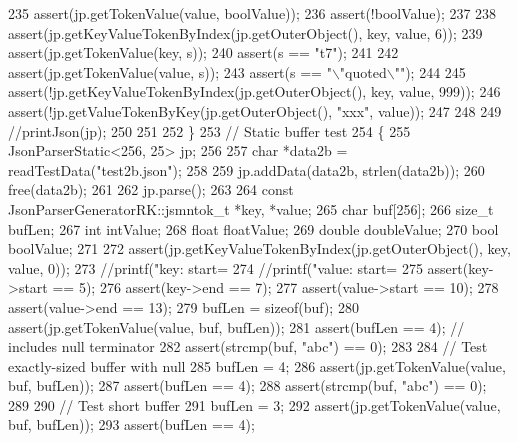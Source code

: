 \begin{DoxyCode}
{{{235         assert(jp.getTokenValue(value, boolValue));
236         assert(!boolValue);
237 
238         assert(jp.getKeyValueTokenByIndex(jp.getOuterObject(), key, value, 6));
239         assert(jp.getTokenValue(key, s));
240         assert(s == \textcolor{stringliteral}{"t7"});
241 
242         assert(jp.getTokenValue(value, s));
243         assert(s == \textcolor{stringliteral}{"\(\backslash\)"quoted\(\backslash\)""});
244 
245         assert(!jp.getKeyValueTokenByIndex(jp.getOuterObject(), key, value, 999));
246         assert(!jp.getValueTokenByKey(jp.getOuterObject(), \textcolor{stringliteral}{"xxx"}, value));
247 
248 
249         \textcolor{comment}{//printJson(jp);}
250 
251 
252     \}
253     \textcolor{comment}{// Static buffer test}
254     \{
255         JsonParserStatic<256, 25> jp;
256 
257         \textcolor{keywordtype}{char} *data2b = readTestData(\textcolor{stringliteral}{"test2b.json"});
258 
259         jp.addData(data2b, strlen(data2b));
260         free(data2b);
261 
262         jp.parse();
263 
264         \textcolor{keyword}{const} JsonParserGeneratorRK::jsmntok_t *key, *value;
265         \textcolor{keywordtype}{char} buf[256];
266         \textcolor{keywordtype}{size\_t} bufLen;
267         \textcolor{keywordtype}{int} intValue;
268         \textcolor{keywordtype}{float} floatValue;
269         \textcolor{keywordtype}{double} doubleValue;
270         \textcolor{keywordtype}{bool} boolValue;
271 
272         assert(jp.getKeyValueTokenByIndex(jp.getOuterObject(), key, value, 0));
273         \textcolor{comment}{//printf("key: start=%
274         \textcolor{comment}{//printf("value: start=%
275         assert(key->start == 5);
276         assert(key->end == 7);
277         assert(value->start == 10);
278         assert(value->end == 13);
279         bufLen = \textcolor{keyword}{sizeof}(buf);
280         assert(jp.getTokenValue(value, buf, bufLen));
281         assert(bufLen == 4); \textcolor{comment}{// includes null terminator}
282         assert(strcmp(buf, \textcolor{stringliteral}{"abc"}) == 0);
283 
284         \textcolor{comment}{// Test exactly-sized buffer with null}
285         bufLen = 4;
286         assert(jp.getTokenValue(value, buf, bufLen));
287         assert(bufLen == 4);
288         assert(strcmp(buf, \textcolor{stringliteral}{"abc"}) == 0);
289 
290         \textcolor{comment}{// Test short buffer}
291         bufLen = 3;
292         assert(jp.getTokenValue(value, buf, bufLen));
293         assert(bufLen == 4);
}}}}}
\end{DoxyCode}
